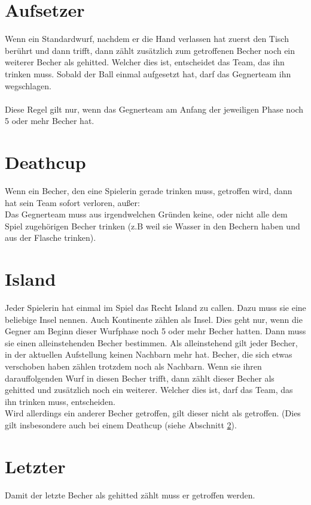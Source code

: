 \documentclass[a5paper, 12pt]{book}
\begin{document}
\section{Aufsetzer}\label{sec:aufsetzer}
Wenn ein Standardwurf, nachdem er die Hand verlassen hat zuerst den Tisch berührt und dann trifft, dann zählt zusätzlich zum getroffenen Becher noch ein weiterer Becher als gehitted. Welcher dies ist, entscheidet das Team, das ihn trinken muss. Sobald der Ball einmal aufgesetzt hat, darf das Gegnerteam ihn wegschlagen.\\\\
Diese Regel gilt nur, wenn das Gegnerteam am Anfang der jeweiligen Phase noch 5 oder mehr Becher hat.

\section{Deathcup}\label{sec:deathcup}
Wenn ein Becher, den eine Spielerin gerade trinken muss, getroffen wird, dann hat sein Team sofort verloren, außer:\\
Das Gegnerteam muss aus irgendwelchen Gründen keine, oder nicht alle dem Spiel zugehörigen Becher trinken (z.B weil sie Wasser in den Bechern haben und aus der Flasche trinken).
\section{Island}\label{sec:island}
Jeder Spielerin hat einmal im Spiel das Recht Island zu callen. Dazu muss sie eine beliebige Insel nennen. Auch Kontinente zählen als Insel. Dies geht nur, wenn die Gegner am Beginn dieser Wurfphase noch 5 oder mehr Becher hatten. Dann muss sie einen alleinstehenden Becher bestimmen. Als alleinstehend gilt jeder Becher, in der aktuellen Aufstellung keinen Nachbarn mehr hat. Becher, die sich etwas verschoben haben zählen trotzdem noch als Nachbarn. Wenn sie ihren darauffolgenden Wurf in diesen Becher trifft, dann zählt dieser Becher als gehitted und zusätzlich noch ein weiterer. Welcher dies ist, darf das Team, das ihn trinken muss, entscheiden.\\
Wird allerdings ein anderer Becher getroffen, gilt dieser nicht als getroffen. (Dies gilt insbesondere auch bei einem Deathcup (siehe Abschnitt \ref{sec:deathcup}).
\section{Letzter}\label{sec:letzter}
Damit der letzte Becher als gehitted zählt muss er getroffen werden. 
\end{document}
